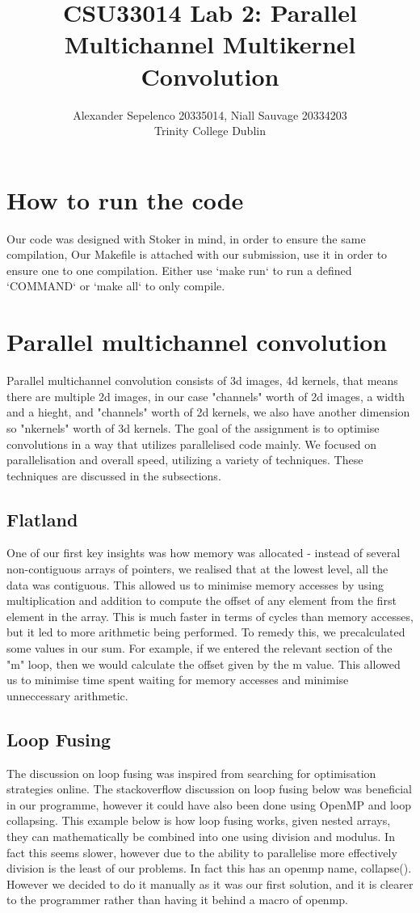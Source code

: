 \documentclass[12pt,fleqn,leqno,letterpaper]{article}
\title{CSU33014 Lab 2: Parallel Multichannel Multikernel Convolution}
\author{Alexander Sepelenco 20335014, Niall Sauvage 20334203\\
  \small{Trinity College Dublin}
}
\begin{document}
\maketitle

\section{How to run the code}
Our code was designed with Stoker in mind, in order to ensure the
same compilation, Our Makefile is attached with our submission, 
use it in order to ensure one to one compilation. 
Either use `make run` to run a defined `COMMAND` or `make all` to only compile.

\section{Parallel multichannel convolution}
Parallel multichannel convolution consists of 3d images, 4d kernels, that means there
are multiple 2d images, in our case "channels" worth of 2d images, a width and a hieght, 
and "channels" worth of 2d kernels, we also have another dimension so "nkernels" worth of 3d kernels. 
The goal of the assignment is to optimise convolutions in a way that utilizes parallelised code mainly.
We focused on parallelisation and overall speed, utilizing a variety of techniques.
These techniques are discussed in the subsections.

\subsection{Flatland}
One of our first key insights was how memory was allocated - instead of several non-contiguous arrays of
pointers, we realised that at the lowest level, all the data was contiguous. This allowed us to minimise 
memory accesses by using multiplication and addition to compute the offset of any element from the first 
element in the array. This is much faster in terms of cycles than memory accesses, but it led to more 
arithmetic being performed. To remedy this, we precalculated some values in our sum. For example, if we
entered the relevant section of the "m" loop, then we would calculate the offset given by the m value. 
This allowed us to minimise time spent waiting for memory accesses and minimise unneccessary arithmetic.

\subsection{Loop Fusing}
The discussion on loop fusing was inspired from searching for optimisation strategies online.
The stackoverflow discussion on loop fusing below was beneficial in our programme, however it could
have also been done using OpenMP and loop collapsing. This example below is how loop fusing works, 
given nested arrays, they can mathematically be combined into one using division and modulus. 
In fact this seems slower, however due to the ability to parallelise more effectively division is 
the least of our problems. In fact this has an openmp name, collapse(). However we decided to do it 
manually as it was our first solution, and it is clearer to the programmer rather than having it behind a macro of openmp.
\end{document}
